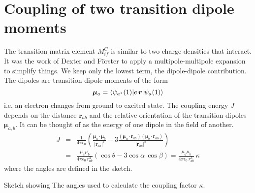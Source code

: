 \section{Coupling of two transition dipole moments}

The transition matrix element $M_{if}^C$ is similar to two charge densities that interact. It was the work of Dexter and Förster to apply a multipole-multipole expansion to simplify things. We keep only the lowest term, the dipole-dipole contribution. The dipoles are transition dipole moments of the form
\begin{equation}
   \boldsymbol{\mu}_a = \braket{ \psi_{a^\star}(1)| e \, \boldsymbol{r} |  \psi_{a}(1) }
\end{equation}
i.e, an electron changes from ground to excited state.
%
The coupling energy $J$ depends on the distance $\boldsymbol{r}_{ab}$ and the relative orientation of the transition dipoles $\boldsymbol{\mu}_{a,b}$. It can be thought of as the energy of one dipole in the field of another.
\begin{eqnarray}
 J & = & \frac{1}{4 \pi \epsilon_0}  \left( \frac{\boldsymbol{\mu}_a \cdot \boldsymbol{\mu}_b }{|\boldsymbol{r}_{ab}|^3} 
  - 3 \frac{ (\boldsymbol{\mu}_a \cdot \boldsymbol{r}_{ab}) (\boldsymbol{\mu}_b \cdot \boldsymbol{r}_{ab})
  }{ |\boldsymbol{r}_{ab}|^5 }  \right)\\
   & = & \frac{\mu_a \mu_b }{4 \pi \epsilon_0 \, r_{ab}^3} \left( \cos \theta - 3 \cos \alpha \, \cos \beta \right) = \frac{\mu_a \mu_b }{4 \pi \epsilon_0 \,r_{ab}^3} \, \kappa  
\end{eqnarray}
where the angles are defined in the sketch.

\begin{marginfigure}

\caption{Sketch showing 
The angles used to calculate the coupling factor $\kappa$.}
\end{marginfigure}

